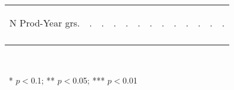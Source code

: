 \begin{center}
\begin{tabular}{lcccccccccccc}
N Prod-Year grs. & \begin{normalsize}.\end{normalsize} & \begin{normalsize}.\end{normalsize} & \begin{normalsize}.\end{normalsize} & \begin{normalsize}.\end{normalsize} & \begin{normalsize}.\end{normalsize} & \begin{normalsize}.\end{normalsize} & \begin{normalsize}.\end{normalsize} & \begin{normalsize}.\end{normalsize} & \begin{normalsize}.\end{normalsize} & \begin{normalsize}.\end{normalsize} & \begin{normalsize}.\end{normalsize} & \begin{normalsize}.\end{normalsize}\\
\noalign{\smallskip}\hline\end{tabular}\\
\smallskip\begin{footnotesize}\ * $p<0$.1; ** $p<0$.05; *** $p<0$.01\end{footnotesize}\\
\smallskip
\end{center}
